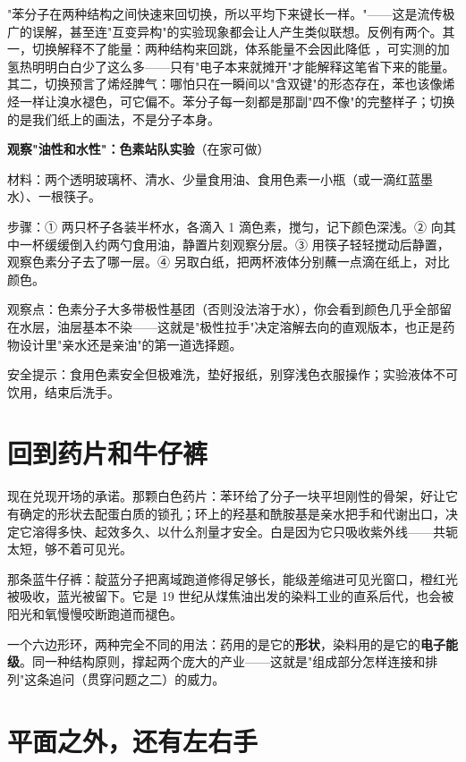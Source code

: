\begin{wuqu}
"苯分子在两种结构之间快速来回切换，所以平均下来键长一样。"——这是流传极广的误解，甚至连"互变异构"的实验现象都会让人产生类似联想。反例有两个。其一，切换解释不了能量：两种结构来回跳，体系能量不会因此降低 ，可实测的加氢热明明白白少了这么多——只有"电子本来就摊开"才能解释这笔省下来的能量。其二，切换预言了烯烃脾气：哪怕只在一瞬间以"含双键"的形态存在，苯也该像烯烃一样让溴水褪色，可它偏不。苯分子每一刻都是那副"四不像"的完整样子；切换的是我们纸上的画法，不是分子本身。
\end{wuqu}

\begin{shiyan}
\textbf{观察"油性和水性"：色素站队实验}（在家可做）

材料：两个透明玻璃杯、清水、少量食用油、食用色素一小瓶（或一滴红蓝墨水）、一根筷子。

步骤：① 两只杯子各装半杯水，各滴入 1 滴色素，搅匀，记下颜色深浅。② 向其中一杯缓缓倒入约两勺食用油，静置片刻观察分层。③ 用筷子轻轻搅动后静置，观察色素分子去了哪一层。④ 另取白纸，把两杯液体分别蘸一点滴在纸上，对比颜色。

观察点：色素分子大多带极性基团（否则没法溶于水），你会看到颜色几乎全部留在水层，油层基本不染——这就是"极性拉手"决定溶解去向的直观版本，也正是药物设计里"亲水还是亲油"的第一道选择题。

安全提示：食用色素安全但极难洗，垫好报纸，别穿浅色衣服操作；实验液体不可饮用，结束后洗手。
\end{shiyan}

\section{回到药片和牛仔裤}

现在兑现开场的承诺。那颗白色药片：苯环给了分子一块平坦刚性的骨架，好让它有确定的形状去配蛋白质的锁孔；环上的羟基和酰胺基是亲水把手和代谢出口，决定它溶得多快、起效多久、以什么剂量才安全。白是因为它只吸收紫外线——共轭太短，够不着可见光。

那条蓝牛仔裤：靛蓝分子把离域跑道修得足够长，能级差缩进可见光窗口，橙红光被吸收，蓝光被留下。它是 19 世纪从煤焦油出发的染料工业的直系后代，也会被阳光和氧慢慢咬断跑道而褪色。

一个六边形环，两种完全不同的用法：药用的是它的\textbf{形状}，染料用的是它的\textbf{电子能级}。同一种结构原则，撑起两个庞大的产业——这就是"组成部分怎样连接和排列"这条追问（贯穿问题之二）的威力。

\section{平面之外，还有左右手}

